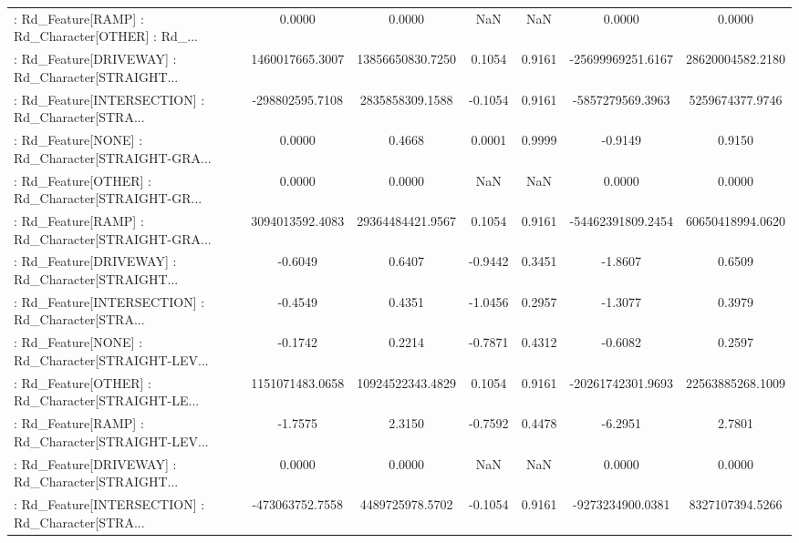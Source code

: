 \begin{longtable}{p{4cm}cccccc}
 : Rd\_Feature[RAMP] : Rd\_Character[OTHER] : Rd\_... &            0.0000 &            0.0000 &     NaN &          NaN &             0.0000 &            0.0000 \\
 : Rd\_Feature[DRIVEWAY] : Rd\_Character[STRAIGHT... &   1460017665.3007 &  13856650830.7250 &  0.1054 &       0.9161 &  -25699969251.6167 &  28620004582.2180 \\
 : Rd\_Feature[INTERSECTION] : Rd\_Character[STRA... &   -298802595.7108 &   2835858309.1588 & -0.1054 &       0.9161 &   -5857279569.3963 &   5259674377.9746 \\
 : Rd\_Feature[NONE] : Rd\_Character[STRAIGHT-GRA... &            0.0000 &            0.4668 &  0.0001 &       0.9999 &            -0.9149 &            0.9150 \\
 : Rd\_Feature[OTHER] : Rd\_Character[STRAIGHT-GR... &            0.0000 &            0.0000 &     NaN &          NaN &             0.0000 &            0.0000 \\
 : Rd\_Feature[RAMP] : Rd\_Character[STRAIGHT-GRA... &   3094013592.4083 &  29364484421.9567 &  0.1054 &       0.9161 &  -54462391809.2454 &  60650418994.0620 \\
 : Rd\_Feature[DRIVEWAY] : Rd\_Character[STRAIGHT... &           -0.6049 &            0.6407 & -0.9442 &       0.3451 &            -1.8607 &            0.6509 \\
 : Rd\_Feature[INTERSECTION] : Rd\_Character[STRA... &           -0.4549 &            0.4351 & -1.0456 &       0.2957 &            -1.3077 &            0.3979 \\
 : Rd\_Feature[NONE] : Rd\_Character[STRAIGHT-LEV... &           -0.1742 &            0.2214 & -0.7871 &       0.4312 &            -0.6082 &            0.2597 \\
 : Rd\_Feature[OTHER] : Rd\_Character[STRAIGHT-LE... &   1151071483.0658 &  10924522343.4829 &  0.1054 &       0.9161 &  -20261742301.9693 &  22563885268.1009 \\
 : Rd\_Feature[RAMP] : Rd\_Character[STRAIGHT-LEV... &           -1.7575 &            2.3150 & -0.7592 &       0.4478 &            -6.2951 &            2.7801 \\
 : Rd\_Feature[DRIVEWAY] : Rd\_Character[STRAIGHT... &            0.0000 &            0.0000 &     NaN &          NaN &             0.0000 &            0.0000 \\
 : Rd\_Feature[INTERSECTION] : Rd\_Character[STRA... &   -473063752.7558 &   4489725978.5702 & -0.1054 &       0.9161 &   -9273234900.0381 &   8327107394.5266 \\

\end{longtable}
